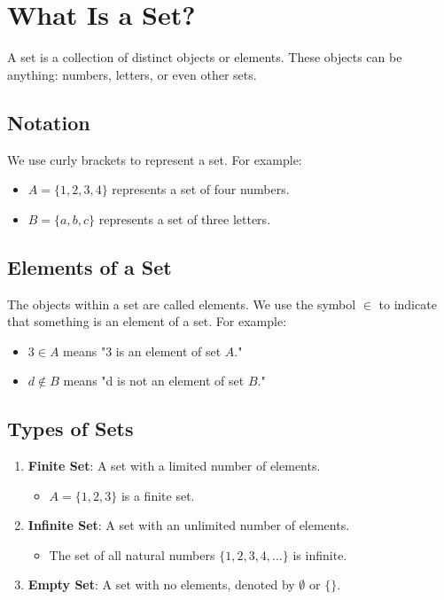 \section{What Is a Set?}
A set is a collection of distinct objects or elements. These objects can be anything: numbers, letters, or even other sets.

\subsection{Notation}
We use curly brackets to represent a set. For example:
\begin{itemize}
    \item \( A = \{1, 2, 3, 4\} \) represents a set of four numbers.
    \item \( B = \{a, b, c\} \) represents a set of three letters.
\end{itemize}

\subsection{Elements of a Set}
The objects within a set are called elements. We use the symbol \( \in \) to indicate that something is an element of a set. For example:
\begin{itemize}
    \item \( 3 \in A \) means "3 is an element of set \( A \)."
    \item \( d \notin B \) means "d is not an element of set \( B \)."
\end{itemize}

\subsection{Types of Sets}
\begin{enumerate}
    \item \textbf{Finite Set}: A set with a limited number of elements.
    \begin{itemize}
        \item \( A = \{1, 2, 3\} \) is a finite set.
    \end{itemize}
    \item \textbf{Infinite Set}: A set with an unlimited number of elements.
    \begin{itemize}
        \item The set of all natural numbers \( \{1, 2, 3, 4, \dots\} \) is infinite.
    \end{itemize}
    \item \textbf{Empty Set}: A set with no elements, denoted by \( \emptyset \) or \( \{\} \).
\end{enumerate}

